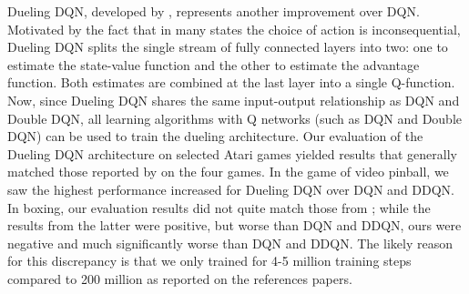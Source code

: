 \documentclass{article}
\begin{document}
Dueling DQN, developed by \cite{wang2016dueling}, represents another improvement
over DQN. Motivated by the fact that in many states the choice of action is
inconsequential, Dueling DQN splits the single stream of fully connected layers
into two: one to estimate the state-value function and the other to estimate the
advantage function. Both estimates are combined at the last layer into a single
Q-function. Now, since Dueling DQN shares the same input-output relationship as
DQN and Double DQN, all learning algorithms with Q networks (such as DQN and
Double DQN) can be used to train the dueling architecture. Our evaluation of the
Dueling DQN architecture on selected Atari games yielded results that generally
matched those reported by \cite{wang2016dueling} on the four games. In the game
of video pinball, we saw the highest performance increased for Dueling DQN over
DQN and DDQN. In boxing, our evaluation results did not quite match those from
\cite{wang2016dueling}; while the results from the latter were positive, but
worse than DQN and DDQN, ours were negative and much significantly worse than
DQN and DDQN. The likely reason for this discrepancy is that we only trained for
4-5 million training steps compared to 200 million as reported on the references
papers.


\end{document}
